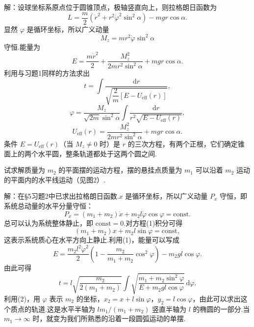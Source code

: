 \begin{xiti}
解：设球坐标系原点位于圆锥顶点，极轴竖直向上，则拉格朗日函数为
\begin{equation*}
  L=\frac{m}{2}\left(\dot{r}^2
  +r^2\dot{\varphi}^2\sin^2\alpha\right)
  -mgr\cos\alpha.
\end{equation*}
显然 $\varphi$ 是循环坐标，所以广义动量
\begin{equation*}
  M_z=mr^2\dot{\varphi}\sin^2\alpha
\end{equation*}
守恒.能量为
\begin{equation*}
  E=\frac{m\dot{r}^2}{2}
  +\frac{M_z^2}{2mr^2\sin^2\alpha}
  +mgr\cos\alpha.
\end{equation*}
利用与习题1同样的方法求出
\begin{equation*}
  t=\int\frac{\mathrm{d}r}
  {\sqrt{\dfrac{2}{m}\left[E-U_{\mathrm{eff}}(r)\right]}},
\end{equation*}
\begin{equation*}
  \varphi=\frac{M_z}{\sqrt{2m}\sin^2\alpha}
  \int\frac{\mathrm{d}r}
  {r^2\sqrt{E-U_{\mathrm{eff}}(r)}},
\end{equation*}
\begin{equation*}
  U_{\mathrm{eff}}(r)=\frac{M_z^2}{2mr^2\sin^2\alpha}
  +mgr\cos\alpha.
\end{equation*}
条件 $E=U_{\mathrm{eff}}(r)$（当 $M_z\neq0$ 时）是 $r$ 的三次方程，有两个正根，它们确定锥面上的两个水平圆，整条轨道都处于这两个圆之间.

\quad 试求解质量为 $m_2$ 的平面摆的运动方程，摆的悬挂点质量为 $m_1$ 可以沿着 $m_2$ 运动的平面内的水平线运动（见图2）.

解：在§5习题2中已求出拉格朗日函数.$x$ 是循环坐标，所以广义动量 $P_x$ 守恒，即系统总动量的水平分量守恒：
\begin{equation*}
  P_x=\left(m_1+m_2\right)\dot{x}
  +m_2l\dot{\varphi}\cos\varphi=\mathrm{const}.
\tag{1}
\end{equation*}
总可以认为系统整体静止，即 $\mathrm{const}=0$.对方程(1)积分可得
\begin{equation*}
  \left(m_1+m_2\right)x+m_2l\sin\varphi
  =\mathrm{const},
\tag{2}
\end{equation*}
这表示系统质心在水平方向上静止.利用(1)，能量可以写成
\begin{equation*}
  E=\frac{m_2l^2\dot{\varphi}^2}{2}
  \left(1-\frac{m_2}{m_1+m_2}\cos^2\varphi\right)
  -m_2gl\cos\varphi.
\tag{3}
\end{equation*}
由此可得
\begin{equation*}
  t=l\sqrt{\frac{m_2}{2\left(m_1+m_2\right)}}
  \int\sqrt{\frac{m_1+m_2\sin^2\varphi}
  {E+m_2gl\cos\varphi}}\,\mathrm{d}\varphi.
\end{equation*}
利用(2)，用 $\varphi$ 表示 $m_2$ 的坐标，$x_2=x+l\sin\varphi$，$y_2=l\cos\varphi$，由此可以求出这个质点的轨道.这是水平半轴为 $lm_1/(m_1+m_2)$ 竖直半轴为 $l$ 的椭圆的一部分.当 $m_1\to\infty$ 时，就变为我们所熟悉的沿着一段圆弧运动的单摆.

\end{xiti}


